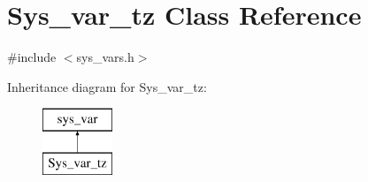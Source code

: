 \hypertarget{classSys__var__tz}{}\section{Sys\+\_\+var\+\_\+tz Class Reference}
\label{classSys__var__tz}


{\ttfamily \#include $<$sys\+\_\+vars.\+h$>$}

Inheritance diagram for Sys\+\_\+var\+\_\+tz\+:\begin{figure}[H]
\begin{center}
\leavevmode
\includegraphics[height=2.000000cm]{classSys__var__tz}
\end{center}
\end{figure}
